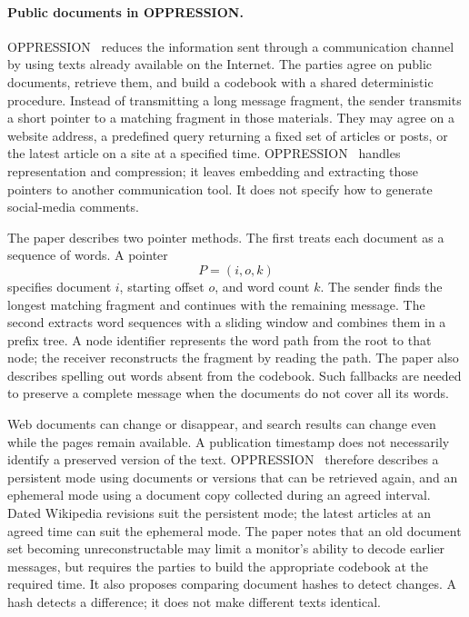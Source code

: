 \paragraph{Public documents in OPPRESSION.}
OPPRESSION~\cite{zillien2024oppression} reduces the information sent through a communication channel by using texts already available on the Internet.
The parties agree on public documents, retrieve them, and build a codebook with a shared deterministic procedure. Instead of transmitting a long message fragment, the sender transmits a short pointer to a matching fragment in those materials.
They may agree on a website address, a predefined query returning a fixed set of articles or posts, or the latest article on a site at a specified time.
OPPRESSION~\cite{zillien2024oppression} handles representation and compression; it leaves embedding and extracting those pointers to another communication tool. It does not specify how to generate social-media comments.

The paper describes two pointer methods. The first treats each document as a sequence of words. A pointer
\[
P=(i,o,k)
\]
specifies document $i$, starting offset $o$, and word count $k$. The sender finds the longest matching fragment and continues with the remaining message.
The second extracts word sequences with a sliding window and combines them in a prefix tree. A node identifier represents the word path from the root to that node; the receiver reconstructs the fragment by reading the path.
The paper also describes spelling out words absent from the codebook. Such fallbacks are needed to preserve a complete message when the documents do not cover all its words.

Web documents can change or disappear, and search results can change even while the pages remain available. A publication timestamp does not necessarily identify a preserved version of the text.
OPPRESSION~\cite{zillien2024oppression} therefore describes a persistent mode using documents or versions that can be retrieved again, and an ephemeral mode using a document copy collected during an agreed interval.
Dated Wikipedia revisions suit the persistent mode; the latest articles at an agreed time can suit the ephemeral mode.
The paper notes that an old document set becoming unreconstructable may limit a monitor's ability to decode earlier messages, but requires the parties to build the appropriate codebook at the required time.
It also proposes comparing document hashes to detect changes. A hash detects a difference; it does not make different texts identical.

